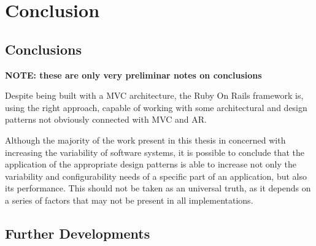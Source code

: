 \chapter{Conclusion}\label{chap:conclusion}

\section{Conclusions}\label{chap:conclusions}

\textbf{NOTE: these are only very preliminar notes on conclusions}

Despite being built with a MVC architecture, the Ruby On Rails framework is, using the right approach, capable of working with some architectural and design patterns not obviously connected with MVC and AR.

Although the majority of the work present in this thesis in concerned with increasing the variability of software systems, it is possible to conclude that the application of the appropriate design patterns is able to increase not only the variability and configurability needs of a specific part of an application, but also its performance. This should not be taken as an universal truth, as it depends on a series of factors that may not be present in all implementations.

\section{Further Developments}\label{sec:further_developments}



